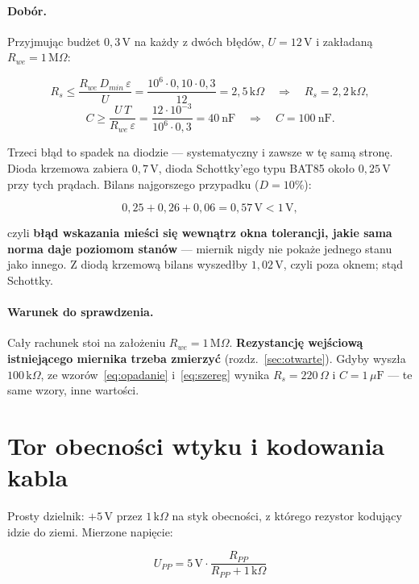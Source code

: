 \documentclass[a4paper,11pt]{article}
\newcommand{\ohm}{\,\Omega}
\newcommand{\kohm}{\,\mathrm{k}\Omega}
\newcommand{\Mohm}{\,\mathrm{M}\Omega}
\newcommand{\volt}{\,\mathrm{V}}
\begin{document}
\paragraph{Dobór.} Przyjmując budżet $0{,}3\volt$ na każdy z dwóch błędów,
$U=12\volt$ i zakładaną $R_{we}=1\Mohm$:

\[
R_s \le \frac{R_{we}\,D_{min}\,\varepsilon}{U}
     = \frac{10^6\cdot0{,}10\cdot0{,}3}{12}=2{,}5\kohm
\quad\Rightarrow\quad R_s = 2{,}2\kohm,
\]
\[
C \ge \frac{U\,T}{R_{we}\,\varepsilon}
   = \frac{12\cdot10^{-3}}{10^{6}\cdot0{,}3}=40\ \mathrm{nF}
\quad\Rightarrow\quad C = 100\ \mathrm{nF}.
\]

Trzeci błąd to spadek na diodzie --- systematyczny i zawsze w tę samą stronę.
Dioda krzemowa zabiera $0{,}7\volt$, dioda Schottky'ego typu BAT85 około
$0{,}25\volt$ przy tych prądach. Bilans najgorszego przypadku ($D=10\%$):

\[
0{,}25 + 0{,}26 + 0{,}06 = 0{,}57\volt < 1\volt ,
\]

czyli \textbf{błąd wskazania mieści się wewnątrz okna tolerancji, jakie sama norma
daje poziomom stanów} --- miernik nigdy nie pokaże jednego stanu jako innego.
Z diodą krzemową bilans wyszedłby $1{,}02\volt$, czyli poza oknem; stąd Schottky.

\paragraph{Warunek do sprawdzenia.} Cały rachunek stoi na założeniu
$R_{we}=1\Mohm$. \textbf{Rezystancję wejściową istniejącego miernika trzeba
zmierzyć} (rozdz.~\ref{sec:otwarte}). Gdyby wyszła $100\kohm$, ze
wzorów~\eqref{eq:opadanie} i~\eqref{eq:szereg} wynika $R_s=220\ohm$
i $C=1\,\mu\mathrm{F}$ --- te same wzory, inne wartości.

\section{Tor obecności wtyku i kodowania kabla}
\label{sec:pp}

Prosty dzielnik: $+5\volt$ przez $1\kohm$ na styk obecności, z którego rezystor
kodujący idzie do ziemi. Mierzone napięcie:

\begin{equation}
U_{PP}=5\volt\cdot\frac{R_{PP}}{R_{PP}+1\kohm}
\end{equation}
\end{document}
